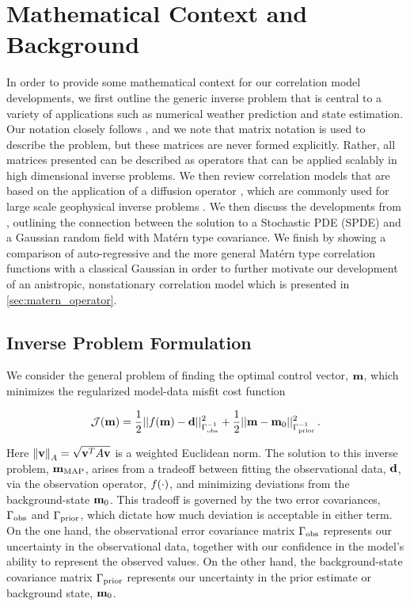 \section{Mathematical Context and Background}
\label{sec:review}

In order to provide some mathematical context for our correlation model
developments, we first outline the generic inverse problem that is central to
a variety of applications such as numerical weather prediction and state
estimation.
Our notation closely follows \citet{ide_unified_1997}, and we note that matrix
notation is used to describe the problem, but these matrices are never formed
explicitly.
Rather, all matrices presented can be described as operators that can be applied
scalably in high dimensional inverse problems.
We then review correlation models that are based on the application of a
diffusion operator \citep{weaver_correlation_2001,mirouze_representation_2010},
which are commonly used for large scale geophysical inverse problems
\citep[e.g.][]{forgetECCOv4}.
We then discuss the developments from \citet{RSSB:RSSB777}, outlining the
connection between the solution to a Stochastic PDE (SPDE) and a Gaussian random
field with Mat\'ern type covariance.
We finish by showing a comparison of auto-regressive and the more general
Mat\'ern type correlation functions with a classical Gaussian in order to
further motivate our development of an anistropic, nonstationary correlation
model which is presented in \cref{sec:matern_operator}.


\subsection{Inverse Problem Formulation}
\label{ssec:da_formulation}

We consider the general problem of finding the optimal control vector,
$\mathbf{m}$, which minimizes the regularized model-data misfit cost function
\begin{linenomath*}\begin{equation*}
    \mathcal{J}(\mathbf{m}) =
        \dfrac{1}{2}||f(\mathbf{m}) - \mathbf{d}||_{\Gamma_\text{obs}^{-1}}^2
        +
        \dfrac{1}{2}||\mathbf{m} - \mathbf{m}_{0}||_{\Gamma_{\text{prior}}^{-1}}^2 \, .
\end{equation*}\end{linenomath*}
Here $\left\lVert\mathbf{v}\right\rVert_A = \sqrt{\mathbf{v}^T A \mathbf{v}}$ is a weighted
Euclidean norm.
The solution to this inverse problem, $\mathbf{m}_{\text{MAP}}$, arises from a tradeoff between fitting the
observational data, $\mathbf{d}$, via the observation operator, $f(\cdot)$,
and minimizing deviations from the background-state $\mathbf{m}_{0}$.
This tradeoff is governed by the two error covariances, $\Gamma_\text{obs}$ and
$\Gamma_{\text{prior}}$, which dictate how much deviation is acceptable in either term.
On the one hand, the observational error covariance matrix
$\Gamma_\text{obs}$ represents our uncertainty
in the observational data, together with our confidence in the model's ability
to represent the observed values.
On the other hand, the background-state covariance matrix $\Gamma_{\text{prior}}$
represents our uncertainty in the prior estimate or background state,
$\mathbf{m}_{0}$.

